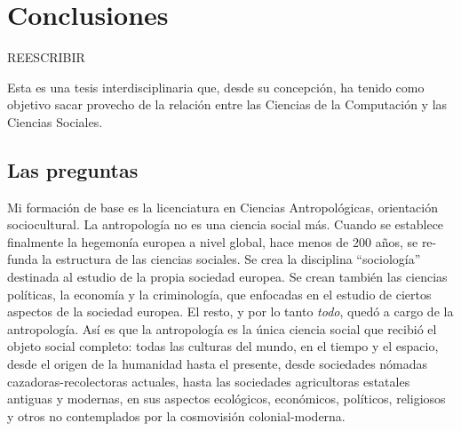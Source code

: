 \documentclass[a4paper,11pt]{book}
\theoremstyle{definition}
\begin{document}
\chapter{Conclusiones}



REESCRIBIR



Esta es una tesis interdisciplinaria que, desde su concepci\'on, ha tenido como objetivo sacar provecho de la relaci\'on entre las Ciencias de la Computaci\'on y las Ciencias Sociales.

%

\section{Las preguntas}

Mi formaci\'on de base es la licenciatura en Ciencias Antropol\'ogicas, orientaci\'on sociocultural.
%
La antropolog\'ia no es una ciencia social m\'as.
%
Cuando se establece finalmente la hegemon\'ia europea a nivel global, hace menos de 200 a\~nos, se re-funda la estructura de las ciencias sociales.
%
Se crea la disciplina ``sociolog\'ia'' destinada al estudio de la propia sociedad europea.
%
Se crean tambi\'en las ciencias pol\'iticas, la econom\'ia y la criminolog\'ia, que enfocadas en el estudio de ciertos aspectos de la sociedad europea.
%
El resto, y por lo tanto \emph{todo}, qued\'o a cargo de la antropolog\'ia.
%
As\'i es que la antropolog\'ia es la \'unica ciencia social que recibi\'o el objeto social completo: todas las culturas del mundo, en el tiempo y el espacio, desde el origen de la humanidad hasta el presente, desde sociedades n\'omadas cazadoras-recolectoras actuales, hasta las sociedades agricultoras estatales antiguas y modernas, en sus aspectos ecol\'ogicos, econ\'omicos, pol\'iticos, religiosos y otros no contemplados por la cosmovisi\'on colonial-moderna.
\end{document}
